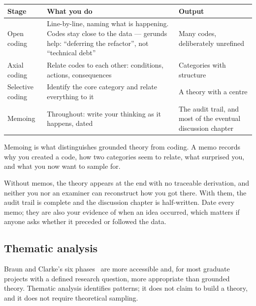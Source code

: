 \begin{center}
\small
\begin{tabular}{@{}L{2.6cm}L{5.4cm}L{6.3cm}@{}}
\toprule
\textbf{Stage} & \textbf{What you do} & \textbf{Output} \\
\midrule
Open coding
  & Line-by-line, naming what is happening. Codes stay close to the data ---
    gerunds help: ``deferring the refactor'', not ``technical debt''
  & Many codes, deliberately unrefined \\
Axial coding
  & Relate codes to each other: conditions, actions, consequences
  & Categories with structure \\
Selective coding
  & Identify the core category and relate everything to it
  & A theory with a centre \\
Memoing
  & Throughout: write your thinking as it happens, dated
  & The audit trail, and most of the eventual discussion chapter \\
\bottomrule
\end{tabular}
\end{center}

\begin{alertbox}
Memoing is what distinguishes grounded theory from coding. A memo records why
you created a code, how two categories seem to relate, what surprised you, and
what you now want to sample for.

\medskip
Without memos, the theory appears at the end with no traceable derivation, and
neither you nor an examiner can reconstruct how you got there. With them, the
audit trail is complete and the discussion chapter is half-written. Date every
memo; they are also your evidence of when an idea occurred, which matters if
anyone asks whether it preceded or followed the data.
\end{alertbox}

\subsection{Thematic analysis}

Braun and Clarke's six phases~\cite{braun2006using} are more accessible and, for
most graduate projects with a defined research question, more appropriate than
grounded theory. Thematic analysis identifies patterns; it does not claim to
build a theory, and it does not require theoretical sampling.

